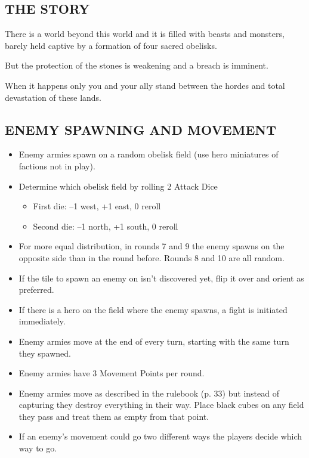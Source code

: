 \begin{multicols*}{2}
\subsection*{\MakeUppercase{The story}}

There is a world beyond this world and it is filled with beasts and monsters, 
barely held captive by a formation of four sacred obelisks.

But the protection of the stones is weakening and a breach is imminent.

When it happens only you and your ally stand between the hordes and total 
devastation of these lands.

\end{multicols*}

\newpage

\subsection*{\MakeUppercase{Enemy spawning and movement}}

\begin{itemize}
    \item Enemy armies spawn on a random obelisk field (use hero miniatures of factions not in play).
    \item Determine which obelisk field by rolling 2 Attack Dice
    \begin{itemize}
        \item First die: --1 west, +1 east, 0 reroll
        \item Second die: --1 north, +1 south, 0 reroll
    \end{itemize}
    \item For more equal distribution, in rounds 7 and 9 the enemy spawns on the opposite side
    than in the round before. Rounds 8 and 10 are all random.
    \item If the tile to spawn an enemy on isn't discovered yet, flip it over and orient as preferred.
    \item If there is a hero on the field where the enemy spawns, a fight is initiated immediately.
    \item Enemy armies move at the end of every turn, starting with the same turn they spawned.
    \item Enemy armies have 3 Movement Points per round.
    \item Enemy armies move as described in the rulebook (p. 33) but instead of capturing they destroy
    everything in their way. Place black cubes on any field they pass and treat them as empty from that point.
    \item If an enemy's movement could go two different ways the players decide which way to go.
\end{itemize}

